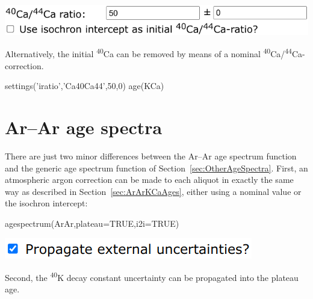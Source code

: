 \begin{refsection}
\noindent\begin{minipage}[t]{.55\linewidth}
\strut\vspace*{-\baselineskip}\newline
\includegraphics[width=\linewidth]{../figures/KCaNominalInitials.png}
\end{minipage}
\begin{minipage}[t]{.45\linewidth}
Alternatively, the initial \textsuperscript{40}Ca can be removed by
means of a nominal
\textsuperscript{40}Ca/\textsuperscript{44}Ca-correction.
\end{minipage}

\begin{script}
settings('iratio','Ca40Ca44',50,0)
age(KCa)
\end{script}

\section{Ar--Ar age spectra}\label{sec:ArArAgeSpectra}

There are just two minor differences between the Ar--Ar age spectrum
function and the generic age spectrum function of
Section~\ref{sec:OtherAgeSpectra}. First, an atmospheric argon
correction can be made to each aliquot in exactly the same way as
described in Section~\ref{sec:ArArKCaAges}, either using a nominal
value or the isochron intercept:

\begin{console}
agespectrum(ArAr,plateau=TRUE,i2i=TRUE)
\end{console}

\noindent\begin{minipage}[t]{.35\linewidth}
\strut\vspace*{-\baselineskip}\newline
\includegraphics[width=\linewidth]{../figures/ArArExterr.png}
\end{minipage}
\begin{minipage}[t]{.65\linewidth}
Second, the \textsuperscript{40}K decay constant uncertainty can be
propagated into the plateau age.
\end{minipage}


\end{refsection}
